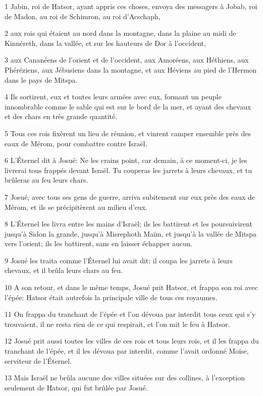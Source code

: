 \par 1 Jabin, roi de Hatsor, ayant appris ces choses, envoya des messagers à Jobab, roi de Madon, au roi de Schimron, au roi d'Acschaph,
\par 2 aux rois qui étaient au nord dans la montagne, dans la plaine au midi de Kinnéreth, dans la vallée, et sur les hauteurs de Dor à l'occident,
\par 3 aux Cananéens de l'orient et de l'occident, aux Amoréens, aux Héthiens, aux Phéréziens, aux Jébusiens dans la montagne, et aux Héviens au pied de l'Hermon dans le pays de Mitspa.
\par 4 Ils sortirent, eux et toutes leurs armées avec eux, formant un peuple innombrable comme le sable qui est sur le bord de la mer, et ayant des chevaux et des chars en très grande quantité.
\par 5 Tous ces rois fixèrent un lieu de réunion, et vinrent camper ensemble près des eaux de Mérom, pour combattre contre Israël.
\par 6 L'Éternel dit à Josué: Ne les crains point, car demain, à ce moment-ci, je les livrerai tous frappés devant Israël. Tu couperas les jarrets à leurs chevaux, et tu brûleras au feu leurs chars.
\par 7 Josué, avec tous ses gens de guerre, arriva subitement sur eux près des eaux de Mérom, et ils se précipitèrent au milieu d'eux.
\par 8 L'Éternel les livra entre les mains d'Israël; ils les battirent et les poursuivirent jusqu'à Sidon la grande, jusqu'à Misrephoth Maïm, et jusqu'à la vallée de Mitspa vers l'orient; ils les battirent, sans en laisser échapper aucun.
\par 9 Josué les traita comme l'Éternel lui avait dit; il coupa les jarrets à leurs chevaux, et il brûla leurs chars au feu.
\par 10 A son retour, et dans le même temps, Josué prit Hatsor, et frappa son roi avec l'épée: Hatsor était autrefois la principale ville de tous ces royaumes.
\par 11 On frappa du tranchant de l'épée et l'on dévoua par interdit tous ceux qui s'y trouvaient, il ne resta rien de ce qui respirait, et l'on mit le feu à Hatsor.
\par 12 Josué prit aussi toutes les villes de ces rois et tous leurs rois, et il les frappa du tranchant de l'épée, et il les dévoua par interdit, comme l'avait ordonné Moïse, serviteur de l'Éternel.
\par 13 Mais Israël ne brûla aucune des villes situées sur des collines, à l'exception seulement de Hatsor, qui fut brûlée par Josué.
